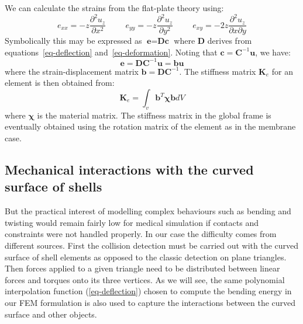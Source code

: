 \documentclass{llncs}
\begin{document}
We can calculate the strains from the flat-plate theory using:
\begin{equation}
\label{eq-deformation}
e_{xx} = -z \frac{\partial^2u_z}{\partial x^2}
\hspace{1cm}
e_{yy} = -z \frac{\partial^2u_z}{\partial y^2}
\hspace{1cm}
e_{xy} = -2z \frac{\partial^2u_z}{\partial x \partial y}
\end{equation} 
Symbolically this may be expressed as $\textbf{e} = \textbf{Dc}$ where $\textbf{D}$ derives from equations~\ref{eq-deflection} and~\ref{eq-deformation}. Noting that $\textbf{c} = \textbf{C}^{-1}\textbf{u}$, we have:
\begin{equation}
\textbf{e} = \textbf{DC}^{-1}\textbf{u} = \textbf{bu}
\end{equation} 
where the strain-displacement matrix $\textbf{b} = \textbf{DC}^{-1}$. 
The stiffness matrix $\textbf{K}_e$ for an element is then obtained from:
\begin{equation}
\textbf{K}_e = \int_v \textbf{b}^{T} \boldsymbol\chi \textbf{b} dV
\end{equation} 
where $\boldsymbol\chi$ is the material matrix. The stiffness matrix in the global frame is eventually obtained using the rotation matrix of the element as in the membrane case. 

\subsection{Mechanical interactions with the curved surface of shells}
\label{sec:interactions}
But the practical interest of modelling complex behaviours such as bending and twisting would remain fairly low for medical simulation if contacts and constraints were not handled properly. In our case the difficulty comes from different sources. First the collision detection must be carried out with the curved surface of shell elements as opposed to the classic detection on plane triangles. Then forces applied to a given triangle need to be distributed between linear forces and torques onto its three vertices.  As we will see, the same polynomial interpolation function (\ref{eq-deflection}) chosen to compute the bending energy in our FEM formulation is also used to capture the interactions between the curved surface and other objects. 
\end{document}
